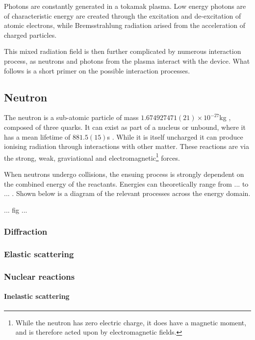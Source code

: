 Photons are constantly generated in a tokamak plasma. Low energy photons are of characteristic energy are created through the excitation and de-excitation of atomic electrons, while Bremsstrahlung radiation arised from the acceleration of charged particles.

This mixed radiation field is then further complicated by numerous interaction process, as neutrons and photons from the plasma interact with the device. What follows is a short primer on the possible interaction processes.

\subsection{Neutron}
The neutron is a sub-atomic particle of mass $1.674927471(21)\times10^{-27}$kg \cite{}, composed of three quarks. It can exist as part of a nucleus or unbound, where it has a mean lifetime of $881.5(15)$s \cite{}. While it is itself uncharged it can produce ionising radiation through interactions with other matter. These reactions are via the strong, weak, graviational and electromagnetic\footnote{While the neutron has zero electric charge, it does have a magnetic moment, and is therefore acted upon by electromagnetic fields.} forces. 

When neutrons undergo collisions, the ensuing process is strongly dependent on the combined energy of the reactants. Energies can theoretically range from ... to ... . Shown below is a diagram of the relevant processes across the energy domain.

... fig ...

\subsubsection{Diffraction}

\subsubsection{Elastic scattering}

\subsubsection{Nuclear reactions}

\paragraph{Inelastic scattering}

